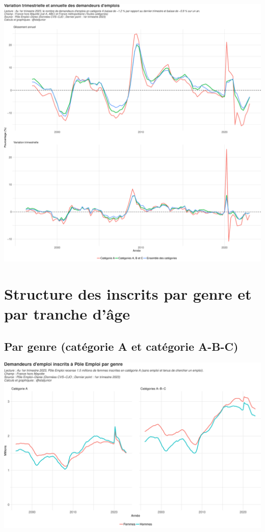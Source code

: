 \documentclass[
  paper=a4,
  ,captions=tableheading
]{scrartcl}
\begin{document}
\includegraphics{rapport_pdf_demandeurs_emploi_pole_emploi_files/figure-latex/unnamed-chunk-5-1.pdf}

\hypertarget{structure-des-inscrits-par-genre-et-par-tranche-duxe2ge}{%
\section{Structure des inscrits par genre et par tranche
d'âge}\label{structure-des-inscrits-par-genre-et-par-tranche-duxe2ge}}

\hypertarget{par-genre-catuxe9gorie-a-et-catuxe9gorie-a-b-c}{%
\subsection{Par genre (catégorie A et catégorie
A-B-C)}\label{par-genre-catuxe9gorie-a-et-catuxe9gorie-a-b-c}}

\includegraphics{rapport_pdf_demandeurs_emploi_pole_emploi_files/figure-latex/unnamed-chunk-7-1.pdf}
\end{document}
